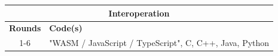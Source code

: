 \centering
\small
\begin{tabular}{|c|p{10cm}|}
\hline
\multicolumn{2}{|c|}{\textbf{Interoperation}}  \\ \hline
\textbf{Rounds} & \textbf{Code(s)}                                         \\ \hline
1-6             & \begin{minipage}[t]{0.8\textwidth} "WASM / JavaScript / TypeScript", C, C++, Java, Python\end{minipage} \\ \hline
\end{tabular}

